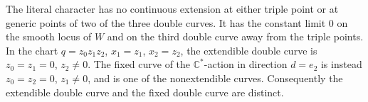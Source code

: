 \begin{proposition}\label{mapsI:src:A.1.2}
The literal character has no continuous extension at either
triple point or at generic points of two of the three double
curves.  It has the constant limit $0$ on the smooth locus of
$W$ and on the third double curve away from the triple points.
In the chart $q=z_0z_1z_2$, $x_1=z_1$, $x_2=z_2$, the extendible
double curve is $z_0=z_1=0$, $z_2\ne0$.  The fixed curve of the
$\mathbb C^*$-action in direction $d=e_2$ is instead
$z_0=z_2=0$, $z_1\ne0$, and is one of the nonextendible curves.
Consequently the extendible double curve and the fixed double curve are distinct.
\end{proposition}


